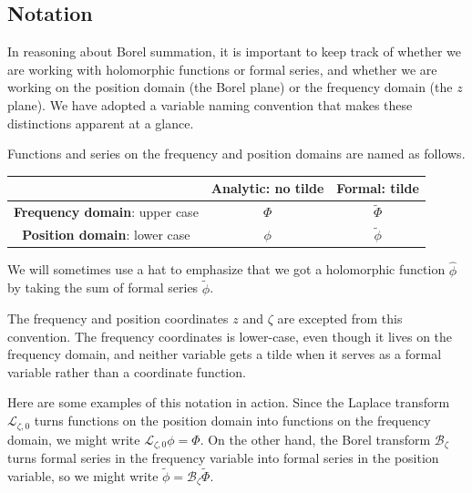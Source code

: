 \documentclass[10pt,a4paper]{amsart}
\newcommand{\series}[1]{\tilde{#1}}
\newcommand{\laplace}{\mathcal{L}}
\newcommand{\borel}{\mathcal{B}}
\numberwithin{equation}{section}
\begin{document}
\subsection{Notation}
In reasoning about Borel summation, it is important to keep track of whether we are working with holomorphic functions or formal series, and whether we are working on the position domain (the Borel plane) or the frequency domain (the $z$ plane). We have adopted a variable naming convention that makes these distinctions apparent at a glance.
\begin{notation*}
Functions and series on the frequency and position domains are named as follows.
\begin{center}
\begin{tabular}{c|c|c}
& \textbf{Analytic}: no tilde & \textbf{Formal}: tilde \\[1mm] \hline
\vphantom{\rule{0mm}{5mm}} \textbf{Frequency domain}: upper case & $\Phi$ & $\series{\Phi}$ \\[1mm] \hline
\vphantom{\rule{0mm}{5mm}} \textbf{Position domain}: lower case & $\phi$ & $\series{\phi}$ \\[1mm]
\end{tabular}
\end{center}
We will sometimes use a hat to emphasize that we got a holomorphic function $\hat{\phi}$ by taking the sum of formal series $\series{\phi}$.

The frequency and position coordinates $z$ and $\zeta$ are excepted from this convention. The frequency coordinates is lower-case, even though it lives on the frequency domain, and neither variable gets a tilde when it serves as a formal variable rather than a coordinate function.
\end{notation*}

Here are some examples of this notation in action. Since the Laplace transform $\laplace_{\zeta, 0}$ turns functions on the position domain into functions on the frequency domain, we might write ${\laplace_{\zeta,0} \phi = \Phi}$. On the other hand, the Borel transform $\borel_\zeta$ turns formal series in the frequency variable into formal series in the position variable, so we might write $\series{\phi} = \borel_\zeta \series{\Phi}$.
\end{document}
